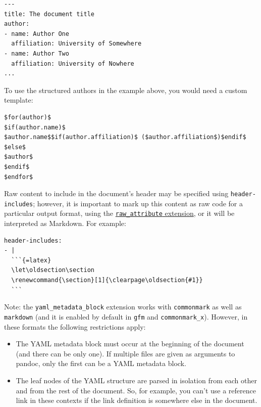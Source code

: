 \documentclass[
]{article}
\begin{document}
\begin{verbatim}
---
title: The document title
author:
- name: Author One
  affiliation: University of Somewhere
- name: Author Two
  affiliation: University of Nowhere
...
\end{verbatim}

To use the structured authors in the example above, you would need a
custom template:

\begin{verbatim}
$for(author)$
$if(author.name)$
$author.name$$if(author.affiliation)$ ($author.affiliation$)$endif$
$else$
$author$
$endif$
$endfor$
\end{verbatim}

Raw content to include in the document's header may be specified using
\texttt{header-includes}; however, it is important to mark up this
content as raw code for a particular output format, using the
\protect\hyperlink{extension-raw_attribute}{\texttt{raw\_attribute}
extension}, or it will be interpreted as Markdown. For example:

\begin{verbatim}
header-includes:
- |
  ```{=latex}
  \let\oldsection\section
  \renewcommand{\section}[1]{\clearpage\oldsection{#1}}
  ```
\end{verbatim}

Note: the \texttt{yaml\_metadata\_block} extension works with
\texttt{commonmark} as well as \texttt{markdown} (and it is enabled by
default in \texttt{gfm} and \texttt{commonmark\_x}). However, in these
formats the following restrictions apply:

\begin{itemize}
\item
  The YAML metadata block must occur at the beginning of the document
  (and there can be only one). If multiple files are given as arguments
  to pandoc, only the first can be a YAML metadata block.
\item
  The leaf nodes of the YAML structure are parsed in isolation from each
  other and from the rest of the document. So, for example, you can't
  use a reference link in these contexts if the link definition is
  somewhere else in the document.
\end{itemize}
\end{document}

